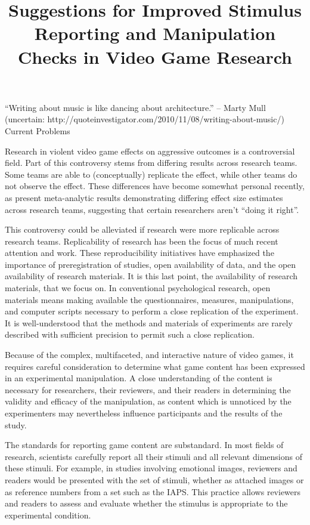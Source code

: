 
\title{Suggestions for Improved Stimulus Reporting and Manipulation Checks in Video Game Research}

 “Writing about music is like dancing about architecture.” – Marty Mull (uncertain: http://quoteinvestigator.com/2010/11/08/writing-about-music/)
Current Problems 

Research in violent video game effects on aggressive outcomes is a controversial field. Part of this controversy stems from differing results across research teams. Some teams are able to (conceptually) replicate the effect, while other teams do not observe the effect. These differences have become somewhat personal recently, as \citet{Greitemeyer:Mugge:2014} present meta-analytic results demonstrating differing effect size estimates across research teams, suggesting that certain researchers aren't ``doing it right''. %

This controversy could be alleviated if research were more replicable across research teams. Replicability of research has been the focus of much recent attention and work. These reproducibility initiatives have emphasized the importance of preregistration of studies, open availability of data, and the open availability of research materials. %
It is this last point, the availability of research materials, that we focus on. In conventional psychological research, open materials means making available the questionnaires, measures, manipulations, and computer scripts necessary to perform a close replication of the experiment. It is well-understood that the methods and materials of experiments are rarely described with sufficient precision to permit such a close replication. %

Because of the complex, multifaceted, and interactive nature of video games, it requires careful consideration to determine what game content has been expressed in an experimental manipulation. A close understanding of the content is necessary for researchers, their reviewers, and their readers in determining the validity and efficacy of the manipulation, as content which is unnoticed by the experimenters may nevertheless influence participants and the results of the study.

The standards for reporting game content are substandard. In most fields of research, scientists carefully report all their stimuli and all relevant dimensions of these stimuli. For example, in studies involving emotional images, reviewers and readers would be presented with the set of stimuli, whether as attached images or as reference numbers from a set such as the IAPS. This practice allows reviewers and readers to assess and evaluate whether the stimulus is appropriate to the experimental condition. 

